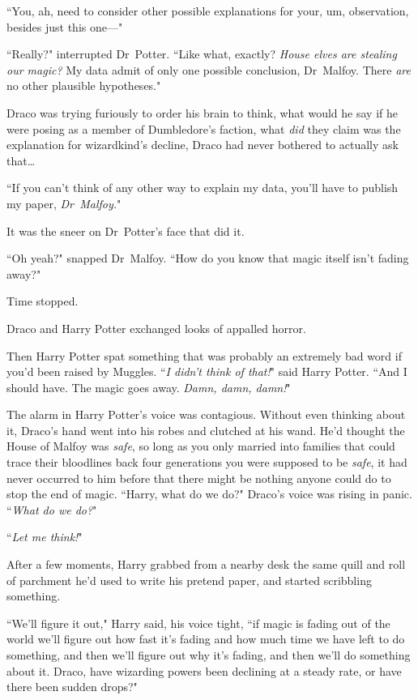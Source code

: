 ``You, ah, need to consider other possible explanations for your, um, observation, besides just this one—"

``Really?" interrupted Dr~Potter. ``Like what, exactly? \emph{House elves are stealing our magic?} My data admit of only one possible conclusion, Dr~Malfoy. There \emph{are} no other plausible hypotheses."

Draco was trying furiously to order his brain to think, what would he say if he were posing as a member of Dumbledore's faction, what \emph{did} they claim was the explanation for wizardkind's decline, Draco had never bothered to actually ask that{\ldots}

``If you can't think of any other way to explain my data, you'll have to publish my paper, \emph{Dr~Malfoy.}"

It was the sneer on Dr~Potter's face that did it.

``Oh yeah?" snapped Dr~Malfoy. ``How do you know that magic itself isn't fading away?"

Time stopped.

Draco and Harry Potter exchanged looks of appalled horror.

Then Harry Potter spat something that was probably an extremely bad word if you'd been raised by Muggles. ``\emph{I didn't think of that!}" said Harry Potter. ``And I should have. The magic goes away. \emph{Damn, damn, damn!}"

The alarm in Harry Potter's voice was contagious. Without even thinking about it, Draco's hand went into his robes and clutched at his wand. He'd thought the House of Malfoy was \emph{safe}, so long as you only married into families that could trace their bloodlines back four generations you were supposed to be \emph{safe}, it had never occurred to him before that there might be nothing anyone could do to stop the end of magic. ``Harry, what do we do?" Draco's voice was rising in panic. ``\emph{What do we do?}"

``\emph{Let me think!}"

After a few moments, Harry grabbed from a nearby desk the same quill and roll of parchment he'd used to write his pretend paper, and started scribbling something.

``We'll figure it out," Harry said, his voice tight, ``if magic is fading out of the world we'll figure out how fast it's fading and how much time we have left to do something, and then we'll figure out why it's fading, and then we'll do something about it. Draco, have wizarding powers been declining at a steady rate, or have there been sudden drops?"

